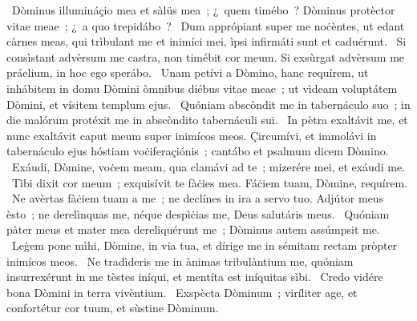~Dòminus illumináçio mea et sàlüs mea~; ¿~quem timébo~? Dòminus protèctor vitae meae~; ¿~a quo trepidábo~? 
~Dum apprópiant super me noċèntes, ut edant càrnes meas, qui trìbulant me et inimíci mei, ìpsi infirmáti sunt et caduérunt. 
~Si consìstant advèrsum me castra, non timébit cor meum. Si exsùrgat advèrsum me práelium, in hoc ego sperábo. 
~Unam petívi a Dòmino, hanc requírem, ut inhábitem in domu Dòmini òmnibus diébus vitae meae~; ut vìdeam voluptátem Dòmini, et vísitem templum ejus. 
~Quóniam abscòndit me in tabernáculo suo~; in die malórum protéxit me in abscòndito tabernáculi sui. 
~In pètra exaltávit me, et nunc exaltávit caput meum super inimícos meos. Çircumívi, et immolávi in tabernáculo ejus hóstiam voċiferaçiónis~; cantábo et psalmum dicem Dòmino. 
~Exáudi, Dòmine, voċem meam, qua clamávi ad te~; mizerére mei, et exáudi me. 
~Tìbi dixit cor meum~; exquisívit te fàċies mea. Fáċiem tuam, Dòmine, requírem. 
~Ne avèrtas fàċiem tuam a me~; ne declínes in ira a servo tuo. Adjútor meus èsto~; ne derelìnquas me, néque despìċias me, Deus salutáris meus. 
~Quóniam pàter meus et mater mea dereliquérunt me~; Dòminus autem assúmpsit me. 
~Leġem pone mìhi, Dòmine, in via tua, et dírige me in sémitam rectam pròpter inimícos meos. 
~Ne tradìderis me in ànimas tribulàntium me, quóniam insurrexérunt in me tèstes iníqui, et mentíta est iníquitas sìbi. 
~Credo vidére bona Dòmini in terra vivèntium. 
~Exspècta Dòminum~; viríliter age, et confortétur cor tuum, et sùstine Dòminum. 

